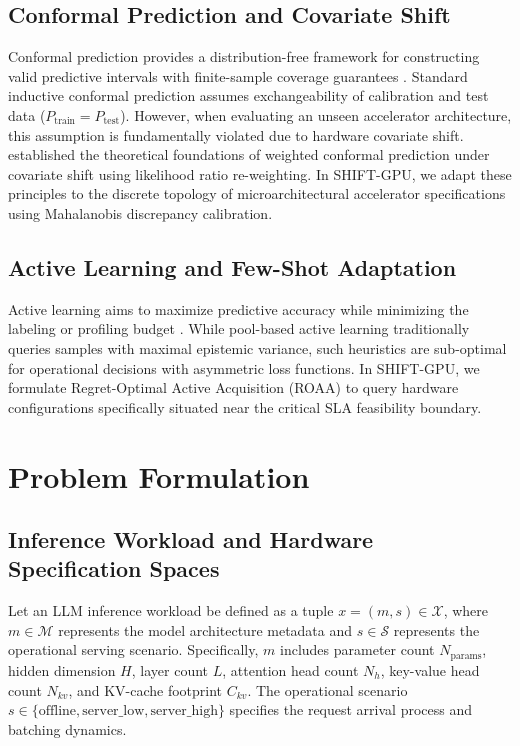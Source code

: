 \documentclass[3p,12pt]{elsarticle}
\begin{document}
\subsection{Conformal Prediction and Covariate Shift}
Conformal prediction provides a distribution-free framework for constructing valid predictive intervals with finite-sample coverage guarantees \citep{angelopoulos2023conformal}. Standard inductive conformal prediction assumes exchangeability of calibration and test data ($P_{\text{train}} = P_{\text{test}}$). However, when evaluating an unseen accelerator architecture, this assumption is fundamentally violated due to hardware covariate shift. \citet{tibshirani2019conformal_covariate} established the theoretical foundations of weighted conformal prediction under covariate shift using likelihood ratio re-weighting. In SHIFT-GPU, we adapt these principles to the discrete topology of microarchitectural accelerator specifications using Mahalanobis discrepancy calibration.

\subsection{Active Learning and Few-Shot Adaptation}
Active learning aims to maximize predictive accuracy while minimizing the labeling or profiling budget \citep{settles2009active}. While pool-based active learning traditionally queries samples with maximal epistemic variance, such heuristics are sub-optimal for operational decisions with asymmetric loss functions. In SHIFT-GPU, we formulate Regret-Optimal Active Acquisition (ROAA) to query hardware configurations specifically situated near the critical SLA feasibility boundary.

\section{Problem Formulation}
\label{sec:formulation}

\subsection{Inference Workload and Hardware Specification Spaces}
Let an LLM inference workload be defined as a tuple $x = (m, s) \in \mathcal{X}$, where $m \in \mathcal{M}$ represents the model architecture metadata and $s \in \mathcal{S}$ represents the operational serving scenario. Specifically, $m$ includes parameter count $N_{\text{params}}$, hidden dimension $H$, layer count $L$, attention head count $N_h$, key-value head count $N_{kv}$, and KV-cache footprint $C_{kv}$. The operational scenario $s \in \{\text{offline}, \text{server\_low}, \text{server\_high}\}$ specifies the request arrival process and batching dynamics.
\end{document}

